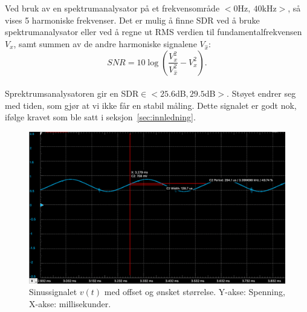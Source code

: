\documentclass[a4paper,11pt,norsk]{article}
\begin{document}
\\\\
Ved bruk av en spektrumanalysator på et frekvensområde $<0$Hz$, \:40$kHz$>$, så vises 5 harmoniske frekvenser.
Det er mulig å finne SDR ved å bruke spektrumanalysator eller ved å regne ut RMS verdien til fundamentalfrekvensen $V_x$, samt summen av de andre harmoniske signalene $V_\hat{x}$:
\begin{equation}
    \textit{SNR} = 10 \log \left( \frac{V^2_x}{V^2_\hat{x}} - V^2_x \right).
\end{equation}
\\
Sprektrumsanalysatoren gir en SDR$\in<25.6$dB$, 29.5$dB$>$. Støyet endrer seg med tiden, som gjør at vi ikke får en stabil måling. Dette signalet er godt nok, ifølge kravet som ble satt i seksjon~\ref{sec:innledning}.
\newpage
\begin{figure}[htbp]
    \centering
    \includegraphics[width=1.0\textwidth]{img/ferdig signal.png}
    \caption{Sinussignalet $v(t)$ med offset og ønsket størrelse. Y-akse: Spenning, X-akse: millisekunder.}
    \label{fig:end_signal}
\end{figure}\\
\newpage
\end{document}
